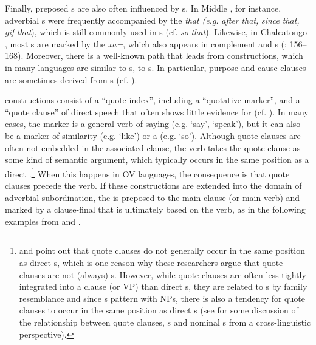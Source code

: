 \documentclass[output=paper]{langsci/langscibook}
\begin{document}
Finally, preposed s are also often influenced by s. In Middle , for instance, adverbial s were frequently accompanied by the  \textit{that} \textit{(e.g.} \textit{after} \textit{that,} \textit{since} \textit{that,} \textit{gif} \textit{that}), which is still commonly used in s (cf. \textit{so} \textit{that}). Likewise, in Chalcatongo , most s are marked by the  \textit{xa=}, which also appears in complement and s (\citealt{Macaulay1996}: 156--168). Moreover, there is a well-known path that leads from  constructions, which in many languages are similar to s, to s. In particular, purpose and cause clauses are sometimes derived from s (cf. \citealt{Güldemann2008}). 

 constructions consist of a “quote index”, including a “quotative marker”, and a “quote clause” of direct speech that often shows little evidence for  (cf. \citealt{Güldemann2008}). In many cases, the  marker is a general verb of saying (e.g. ‘say’, ‘speak’), but it can also be a marker of similarity (e.g. ‘like’) or a   (e.g. ‘so’). Although quote clauses are often not embedded in the associated clause, the  verb takes the quote clause as some kind of semantic argument, which typically occurs in the same position as a direct .\footnote{\citet{Munro1982} and \citet{Güldemann2008} point out that quote clauses do not generally occur in the same position as direct s, which is one reason why these researchers argue that quote clauses are not (always) s. However, while quote clauses are often less tightly integrated into a clause (or VP) than direct s, they are related to  s by family resemblance and since  s pattern with  NPs, there is also a tendency for quote clauses to occur in the same position as direct s (see \citealt{Schmidtke-BodeDiessel2017} for some discussion of the relationship between quote clauses,  s and nominal s from a cross-linguistic perspective).} When this happens in OV languages, the consequence is that quote clauses precede the  verb. If these constructions are extended into the domain of adverbial subordination, the  is preposed to the main clause (or main verb) and marked by a clause-final  that is ultimately based on the  verb, as in the following examples from   and  .
\end{document}
